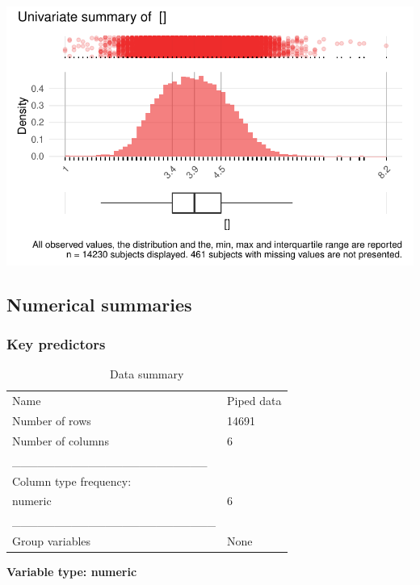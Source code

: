 \documentclass[
  letterpaper,
  DIV=11,
  numbers=noendperiod]{scrreport}
\begin{document}
\includegraphics{./Bact_univar_files/figure-pdf/uni04-38.pdf}

\hypertarget{numerical-summaries}{%
\subsection{Numerical summaries}\label{numerical-summaries}}

\hypertarget{key-predictors}{%
\subsubsection{Key predictors}\label{key-predictors}}

\begin{longtable}[]{@{}ll@{}}
\caption{Data summary}\tabularnewline
\toprule()
\endhead
Name & Piped data \\
Number of rows & 14691 \\
Number of columns & 6 \\
\_\_\_\_\_\_\_\_\_\_\_\_\_\_\_\_\_\_\_\_\_\_\_ & \\
Column type frequency: & \\
numeric & 6 \\
\_\_\_\_\_\_\_\_\_\_\_\_\_\_\_\_\_\_\_\_\_\_\_\_ & \\
Group variables & None \\
\bottomrule()
\end{longtable}

\textbf{Variable type: numeric}
\end{document}
